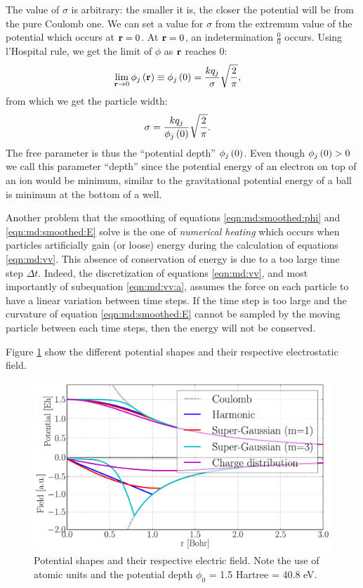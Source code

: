 The value of $\sigma$ is arbitrary: the smaller it is, the closer the potential
will be from the pure Coulomb one. We can set a value for $\sigma$ from the
extremum value of the potential which occurs at $\textbf{r} = 0$. At $\textbf{r} = 0$, an
indetermination $\frac{0}{0}$ occurs. Using l'Hospital rule, we get the limit
of $\phi$ as $\textbf{r}$ reaches 0:
\begin{align}
\lim_{\textbf{r} \rightarrow 0} \phi_j\left( \textbf{r} \right)
    & \equiv \phi_j\left( 0 \right) = \frac{ k q_j }{ \sigma } \sqrt{\frac{2}{\pi}},
\label{eqn:md:smoothed:phi0}
\end{align}
from which we get the particle width:
\begin{align}
\sigma & = \frac{ k q_j }{ \phi_j\left( 0 \right) } \sqrt{ \frac{2}{\pi}}.
\label{eqn:md:sigma}
\end{align}
The free parameter is thus the ``potential depth'' $\phi_j\left( 0 \right)$. Even
though $\phi_j\left( 0 \right) > 0$ we call this parameter ``depth'' since the potential
energy of an electron on top of an ion would be minimum, similar to the
gravitational potential energy of a ball is minimum at the bottom of a well.

Another problem that the smoothing of equations \eqref{eqn:md:smoothed:phi} and
\eqref{eqn:md:smoothed:E} solve is the one of \textit{numerical heating} which
occurs when particles artificially gain (or loose) energy during the
calculation of equations \eqref{eqn:md:vv}. This absence of conservation of
energy is due to a too large time step $\Delta t$. Indeed, the
discretization of equations \eqref{eqn:md:vv}, and most importantly of
subequation \eqref{eqn:md:vv:a}, assumes the force on each particle to have a
linear variation between time steps. If the time step is too large and the
curvature of equation \eqref{eqn:md:smoothed:E} cannot be sampled by the moving
particle between each time steps, then the energy will not be conserved.



Figure \ref{fig:potential:shapes} show the different potential shapes and their
respective electrostatic field.

\begin{figure}
 \centering
 \includegraphics[width=\figurewidth]{figures/potential_shapes}
 \caption{\label{fig:potential:shapes}Potential shapes and their respective
          electric field. Note the use of atomic units and the potential depth
          $\phi_0$ = 1.5 Hartree = 40.8 eV.}
\end{figure}

